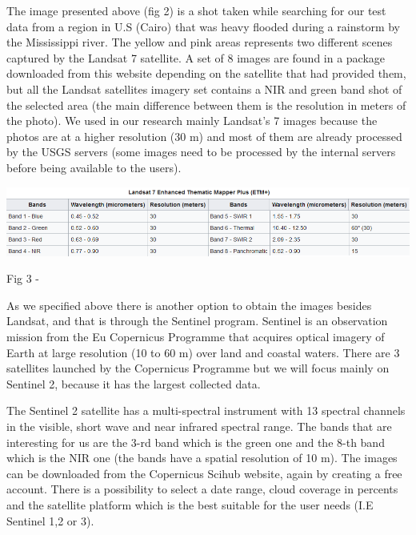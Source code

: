 \documentclass[12pt, a4paper]{report}
\begin{document}
The image presented above (fig 2) is a shot taken while searching for our test data from a region in U.S (Cairo) that was heavy flooded during a rainstorm by the Mississippi river. The yellow and pink areas represents two different scenes captured by the Landsat 7 satellite. A set of 8 images are found in a package downloaded from this website depending on the satellite that had provided them, but all the Landsat satellites imagery set contains a NIR and green band shot of the selected area (the main difference between them is the resolution in meters of the photo). We used in our research mainly Landsat's 7 images because the photos are at a higher resolution (30 m) and most of them are already processed by the USGS servers (some images need to be processed by the internal servers before being available to the users).

\includegraphics[scale=0.73, center]{Capture.png} 
\begin{center}
Fig 3 - \cite{Wiki_landsat}
\end{center}


\medskip

As we specified above there is another option to obtain the images besides Landsat, and that is through the Sentinel program. Sentinel is an observation mission from the Eu Copernicus Programme that acquires optical imagery of Earth at large resolution (10 to 60 m) over land and coastal waters. There are 3 satellites launched by the Copernicus Programme but we will focus mainly on Sentinel 2, because it has the largest collected data. 
\par 

The Sentinel 2 satellite has a multi-spectral instrument with 13 spectral channels in the visible, short wave and near infrared spectral range. The bands that are interesting for us are the 3-rd band which is the green one and the 8-th band which is the NIR one (the bands have a spatial resolution of 10 m). The images  can be downloaded from the Copernicus Scihub website, again by creating a free account. There is a possibility to select a date range, cloud coverage in percents and the satellite platform which is the best suitable for the user needs (I.E Sentinel 1,2 or 3). 
\par 
\end{document}
